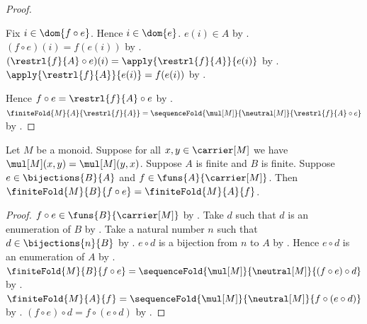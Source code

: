\begin{proof}
\begin{subproof}
        Fix $i\in\dom{f\circ e}$.
        Hence $i\in\dom{e}$.
        $e(i)\in A$ by .
        $(f\circ e)(i)=f(e(i))$ by
            .
        $(\restrl{f}{A}\circ e)(i)
            =\apply{\restrl{f}{A}}{e(i)}$ by
            .
        $\apply{\restrl{f}{A}}{e(i)}=f(e(i))$ by
            .
    \end{subproof}
    Hence $f\circ e=\restrl{f}{A}\circ e$ by
        .
    $\finiteFold{M}{A}{\restrl{f}{A}}
        =\sequenceFold{\mul[M]}{\neutral[M]}{
            \restrl{f}{A}\circ e}$ by
        .
\end{proof}

\begin{theorem}\label{monoid_finite_fold_bijective_reindex}
    Let $M$ be a monoid.
    Suppose for all $x,y\in\carrier[M]$ we have
        $\mul[M](x,y)=\mul[M](y,x)$.
    Suppose $A$ is finite and $B$ is finite.
    Suppose $e\in\bijections{B}{A}$ and
        $f\in\funs{A}{\carrier[M]}$.
    Then
        $\finiteFold{M}{B}{f\circ e}=\finiteFold{M}{A}{f}$.
\end{theorem}
\begin{proof}
    $f\circ e\in\funs{B}{\carrier[M]}$ by
        .
    Take $d$ such that $d$ is an enumeration of $B$ by
        .
    Take a natural number $n$ such that
        $d\in\bijections{n}{B}$ by .
    $e\circ d$ is a bijection from $n$ to $A$ by
        .
    Hence $e\circ d$ is an enumeration of $A$ by
        .
    $\finiteFold{M}{B}{f\circ e}
        =\sequenceFold{\mul[M]}{\neutral[M]}{(f\circ e)\circ d}$ by
        .
    $\finiteFold{M}{A}{f}
        =\sequenceFold{\mul[M]}{\neutral[M]}{f\circ(e\circ d)}$ by
        .
    $(f\circ e)\circ d=f\circ(e\circ d)$ by
        .
\end{proof}

